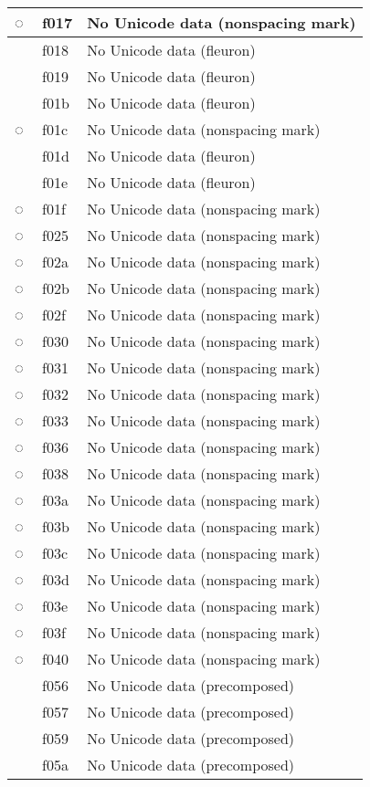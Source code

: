 \documentclass[12pt,letterpaper,openany]{book}
\begin{document}
\begin{center}
\begin{supertabular}{|m{0.25in}|m{0.5in}|m{4in}|}
◌ & f017 & No Unicode data (nonspacing mark)\\\hline
 & f018 & No Unicode data (fleuron)\\\hline
 & f019 & No Unicode data (fleuron)\\\hline
 & f01b & No Unicode data (fleuron)\\\hline
◌ & f01c & No Unicode data (nonspacing mark)\\\hline
 & f01d & No Unicode data (fleuron)\\\hline
 & f01e & No Unicode data (fleuron)\\\hline
◌ & f01f & No Unicode data (nonspacing mark)\\\hline
◌ & f025 & No Unicode data (nonspacing mark)\\\hline
◌ & f02a & No Unicode data (nonspacing mark)\\\hline
◌ & f02b & No Unicode data (nonspacing mark)\\\hline
◌ & f02f & No Unicode data (nonspacing mark)\\\hline
◌ & f030 & No Unicode data (nonspacing mark)\\\hline
◌ & f031 & No Unicode data (nonspacing mark)\\\hline
◌ & f032 & No Unicode data (nonspacing mark)\\\hline
◌ & f033 & No Unicode data (nonspacing mark)\\\hline
◌ & f036 & No Unicode data (nonspacing mark)\\\hline
◌ & f038 & No Unicode data (nonspacing mark)\\\hline
◌ & f03a & No Unicode data (nonspacing mark)\\\hline
◌ & f03b & No Unicode data (nonspacing mark)\\\hline
◌ & f03c & No Unicode data (nonspacing mark)\\\hline
◌ & f03d & No Unicode data (nonspacing mark)\\\hline
◌ & f03e & No Unicode data (nonspacing mark)\\\hline
◌ & f03f & No Unicode data (nonspacing mark)\\\hline
◌ & f040 & No Unicode data (nonspacing mark)\\\hline
 & f056 & No Unicode data (precomposed)\\\hline
 & f057 & No Unicode data (precomposed)\\\hline
 & f059 & No Unicode data (precomposed)\\\hline
 & f05a & No Unicode data (precomposed)\\\hline

\end{supertabular}
\end{center}
\end{document}
